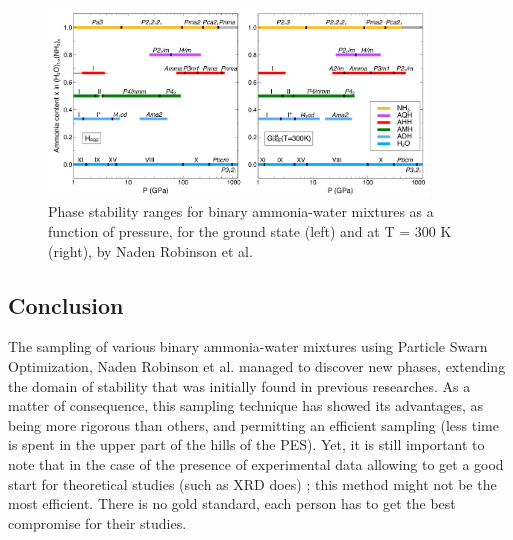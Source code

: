 \documentclass[11pt]{article}
\begin{document}
\begin{figure}[h]
    \centering
    \includegraphics[width=0.9\textwidth]{figures/phase-diagram.png}
    \caption{Phase stability ranges for binary ammonia-water mixtures as a function of pressure, for the ground state (left) and at T = 300 K (right), by Naden Robinson et al. \cite{original}}
\end{figure}
\begin{multicols}{2}

\section*{Conclusion}
The sampling of various binary ammonia-water mixtures using Particle Swarn Optimization, Naden Robinson et al. managed to discover new phases, extending the domain of stability that was initially found in previous researches. As a matter of consequence, this sampling technique has showed its advantages, as being more rigorous than others, and permitting an efficient sampling (less time is spent in the upper part of the hills of the PES). Yet, it is still important to note that in the case of the presence of experimental data allowing to get a good start for theoretical studies (such as XRD does) ; this method might not be the most efficient. There is no gold standard, each person has to get the best compromise for their studies.


\small\normalsize
\end{multicols}
\end{document}
